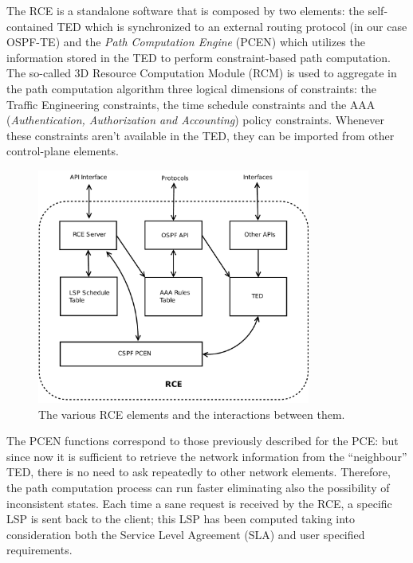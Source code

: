 \documentclass[10pt,a4paper]{report}
\begin{document}
The RCE is a standalone software that is composed by two elements: the
self-contained TED which is synchronized to an external routing
protocol (in our case OSPF-TE) and the \textit{Path Computation
  Engine} (PCEN) which utilizes the information stored in the TED to
perform constraint-based path computation. The so-called 3D Resource
Computation Module (RCM) is used to aggregate in the path computation
algorithm three logical dimensions of constraints: the Traffic
Engineering constraints, the time schedule constraints and the AAA
(\textit{Authentication, Authorization and Accounting}) policy
constraints. Whenever these constraints aren't available in the TED,
they can be imported from other control-plane elements.\\

\begin{figure}[!htbp]
  \begin{center}
    \includegraphics[width=0.8\textwidth]{img/rce_model}
    \caption[RCE model]{The various RCE elements and the
      interactions between them.}
    \label{fig:rce_model}
  \end{center}
\end{figure}

\newpage

The PCEN functions correspond to those previously described for the
PCE: but since now it is sufficient to retrieve the network
information from the ``neighbour'' TED, there is no need to ask
repeatedly to other network elements. Therefore, the path computation
process can run faster eliminating also the possibility of
inconsistent states. Each time a sane request is received by the RCE,
a specific LSP is sent back to the client; this LSP has been computed
taking into consideration both the Service Level Agreement (SLA) and
user specified requirements.
\end{document}
